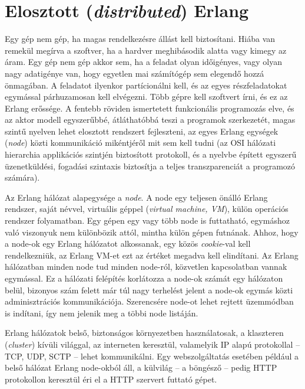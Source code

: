 \documentclass[12pt, a4paper, oneside]{book}
\begin{document}
\section{Elosztott (\emph{distributed}) Erlang}
Egy gép nem gép, ha magas rendelkezésre állást kell biztosítani. Hiába van
remekül megírva a szoftver, ha a hardver meghibásodik alatta vagy kimegy az
áram. Egy gép nem gép akkor sem, ha a feladat olyan időigényes, vagy olyan nagy
adatigénye van, hogy egyetlen mai számítógép sem elegendő hozzá önmagában. A
feladatot ilyenkor partícionálni kell, és az egyes részfeladatokat egymással
párhuzamosan kell elvégezni. Több gépre kell szoftvert írni, és ez az Erlang
erőssége. A fentebb röviden ismertetett funkcionális programozás elve, és az
aktor modell egyszerűbbé, átláthatóbbá teszi a programok szerkezetét, magas
szintű nyelven lehet elosztott rendszert fejleszteni, az egyes Erlang egységek
(\emph{node}) közti kommunikáció mikéntjéről mit sem kell tudni (az OSI
hálózati hierarchia applikációs szintjén biztosított protokoll, és a nyelvbe
épített egyszerű üzenetküldési, fogadási szintaxis biztosítja a teljes
transzparenciát a programozó számára).

Az Erlang hálózat alapegysége a \emph{node}. A node egy teljesen önálló Erlang
rendszer, saját névvel, virtuális géppel (\emph{virtual machine, VM}), külön
operációs rendszer folyamatban. Egy gépen egy vagy több node is futtatható,
egymáshoz való viszonyuk nem különbözik attól, mintha külön gépen futnának.
Ahhoz, hogy a node-ok egy Erlang hálózatot alkossanak, egy közös
\emph{cookie}-val kell rendelkezniük, az Erlang VM-et ezt az értéket megadva
kell elindítani. Az Erlang hálózatban minden node tud minden node-ról,
közvetlen kapcsolatban vannak egymással. Ez a hálózati felépítés korlátozza a
node-ok számát egy hálózaton belül, bizonyos szám felett már túl nagy terhelést
jelent a node-ok egymás közti adminisztrációs kommunikációja. Szerencsére node-ot lehet
rejtett üzemmódban is indítani, így nem jelenik meg a többi node listáján.

Erlang hálózatok belső, biztonságos környezetben használatosak, a klaszteren
(\emph{cluster}) kívüli világgal, az interneten keresztül, valamelyik IP alapú
protokollal -- TCP, UDP, SCTP -- lehet kommunikálni. Egy webszolgáltatás
esetében például a belső hálózat Erlang node-okból áll, a külvilág -- a
böngésző -- pedig HTTP protokollon keresztül éri el a HTTP szervert futtató
gépet. 
\end{document}
